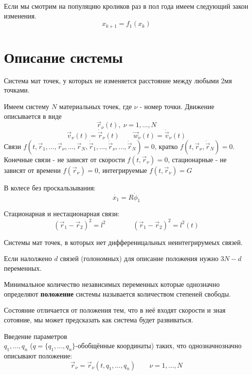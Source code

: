 \documentclass{article}
\begin{document}
\begin{eg}
  Если мы смотрим на популяцию кроликов раз в пол года имеем следующий закон изменения. 
  \[
    x_{k+1}=f_1(x_k)
  \]
\end{eg}

\section{Описание системы}
\begin{definition}
  Система мат точек, у которых не изменяется расстояние между любыми 2мя точками.
\end{definition}
Имеем систему $N$ материальных точек, где $\nu$ - номер точки. 
Движение описывается в виде
\[
  \vec{r}_\nu(t), \; \nu=1,\dots,N
\]
\[
\vec{v}_\nu(t)=\dot{\vec{r}}_\nu(t) \qquad \vec{w}_\nu(t)=\dot{\vec{v}}_\nu(t) 
\]
Связи $f(t,\vec{r}_1,\dots,\vec{r}_\nu,\dots,\vec{r}_N, \dot{\vec{r}}_1, \dots,\dot{\vec{r}}_\nu, \dots, \dot{\vec{r}}_N) =0$, кратко $f(t,\vec{r}_\nu,\dot{\vec{r}}_N)=0$. \\ 
Конечные связи - не зависят от скорости $f(t,\vec{r}_\nu)=0$, 
стационарные - не зависят от времени $f(\vec{r}_\nu)=0$, интегрируемые $f(t,\vec{r}_\nu)=G$

\begin{eg}
\phantom{.}

В колесе без проскальзывания:
\[
  \dot{x_1}=R\dot{\phi}_1
\]
\end{eg}

\begin{eg}
  \phantom{.}

  Стационарная и нестационарная связи:
  \[
    (\vec{r}_1-\vec{r}_2)^2=l^2 \qquad\qquad (\vec{r}_1-\vec{r}_2)^2=l^2(t)
  \]
\end{eg}

\begin{definition}
  Системы мат точек, в которых нет дифференицальных неинтегрирумеых связей.
\end{definition}
\begin{remark}
  Если налолжено $d$ связей (голономных) для описание положения нужно $3N-d$ переменных.
\end{remark}
\begin{definition}
  Минимальное количество независимых переменных которые однозначно определяют \textbf{положение} системы называется количеством степеней свободы.
\end{definition}
\begin{remark}
  Состояние отличается от положения тем, что в неё входят скорости и зная сотояние, мы может предсказать как система будет развиваться.
\end{remark}
\begin{definition}
  Введение параметров \\ $q_1,\dots,q_n$ ($q=\{q_1,\dots,q_n\}$-обобщённые координаты) таких, что однозначнозначно описывают положение:
  \[
    \vec{r}_\nu=\vec{r}_\nu(t,q_1,\dots,q_n) \qquad \nu=1,\dots,N
  \]
\end{definition}
\end{document}
